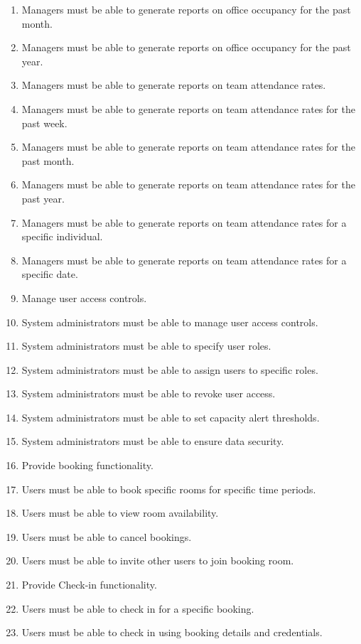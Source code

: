 \documentclass[11pt,a4paper]{article}
\begin{document}
\begin{enumerate}[label=\arabic*.]
    \item Managers must be able to generate reports on office occupancy for the past month.
    \item Managers must be able to generate reports on office occupancy for the past year.
    \item Managers must be able to generate reports on team attendance rates.
    \item Managers must be able to generate reports on team attendance rates for the past week.
    \item Managers must be able to generate reports on team attendance rates for the past month.
    \item Managers must be able to generate reports on team attendance rates for the past year.
    \item Managers must be able to generate reports on team attendance rates for a specific individual.
    \item Managers must be able to generate reports on team attendance rates for a specific date.
    \item Manage user access controls.
    \item System administrators must be able to manage user access controls.
    \item System administrators must be able to specify user roles.
    \item System administrators must be able to assign users to specific roles.
    \item System administrators must be able to revoke user access.
    \item System administrators must be able to set capacity alert thresholds.
    \item System administrators must be able to ensure data security.
    \item Provide booking functionality.
    \item Users must be able to book specific rooms for specific time periods.
    \item Users must be able to view room availability.
    \item Users must be able to cancel bookings.
    \item Users must be able to invite other users to join booking room.
    \item Provide Check-in functionality.
    \item Users must be able to check in for a specific booking.
    \item Users must be able to check in using booking details and credentials.

\end{enumerate}
\end{document}
